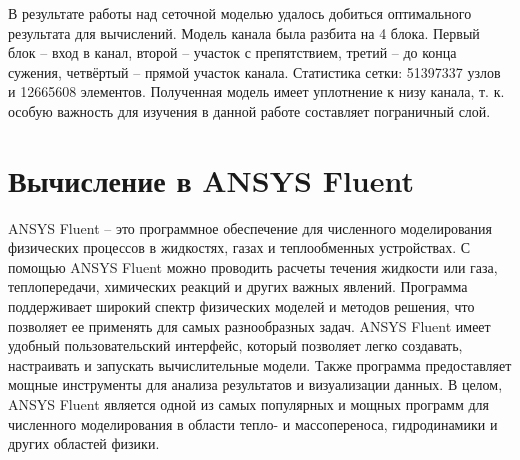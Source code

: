 	В результате работы над сеточной моделью удалось добиться оптимального результата для вычислений. Модель канала была разбита на 4 блока. Первый блок -- вход в канал, второй -- участок с препятствием, третий -- до конца сужения, четвёртый -- прямой участок канала. Статистика сетки: 51397337 узлов и 12665608 элементов. Полученная модель имеет уплотнение к низу канала, т. к. особую важность для изучения в данной работе составляет пограничный слой.

\section{Вычисление в ANSYS Fluent}
	ANSYS Fluent -- это программное обеспечение для численного моделирования физических процессов в жидкостях, газах и теплообменных устройствах. С помощью ANSYS Fluent можно проводить расчеты течения жидкости или газа, теплопередачи, химических реакций и других важных явлений. Программа поддерживает широкий спектр физических моделей и методов решения, что позволяет ее применять для самых разнообразных задач. ANSYS Fluent имеет удобный пользовательский интерфейс, который позволяет легко создавать, настраивать и запускать вычислительные модели. Также программа предоставляет мощные инструменты для анализа результатов и визуализации данных. В целом, ANSYS Fluent является одной из самых популярных и мощных программ для численного моделирования в области тепло- и массопереноса, гидродинамики и других областей физики.